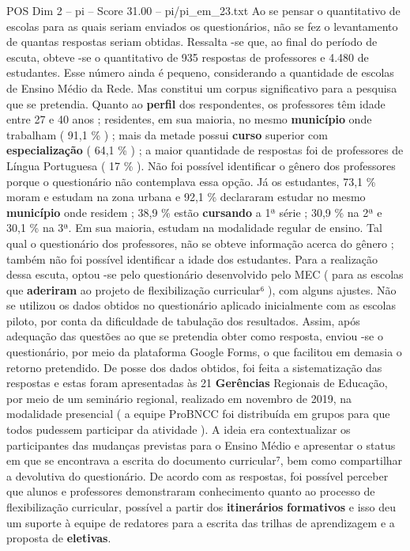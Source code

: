 \begin{textsample}{POS Dim 2 – pi – Score 31.00 – pi/pi\_em\_23.txt}
Ao se pensar o quantitativo de escolas para as quais seriam enviados os questionários, não se fez o levantamento de quantas respostas seriam obtidas.
Ressalta -se que, ao final do período de escuta, obteve -se o quantitativo de 935 respostas de professores e 4.480 de estudantes.
Esse número ainda é pequeno, considerando a quantidade de escolas de Ensino Médio da Rede.
Mas constitui um corpus significativo para a pesquisa que se pretendia.
Quanto ao \textbf{perfil} dos respondentes, os professores têm idade entre 27 e 40 anos ; residentes, em sua maioria, no mesmo \textbf{município} onde trabalham ( 91,1 \% ) ; mais da metade possui \textbf{curso} superior com \textbf{especialização} ( 64,1 \% ) ; a maior quantidade de respostas foi de professores de Língua Portuguesa ( 17 \% ).
Não foi possível identificar o gênero dos professores porque o questionário não contemplava essa opção.
Já os estudantes, 73,1 \% moram e estudam na zona urbana e 92,1 \% declararam estudar no mesmo \textbf{município} onde residem ; 38,9 \% estão \textbf{cursando} a 1ª série ; 30,9 \% na 2ª e 30,1 \% na 3ª.
Em sua maioria, estudam na modalidade regular de ensino.
Tal qual o questionário dos professores, não se obteve informação acerca do gênero ; também não foi possível identificar a idade dos estudantes.
Para a realização dessa escuta, optou -se pelo questionário desenvolvido pelo MEC ( para as escolas que \textbf{aderiram} ao projeto de flexibilização curricular⁶ ), com alguns ajustes.
Não se utilizou os dados obtidos no questionário aplicado inicialmente com as escolas piloto, por conta da dificuldade de tabulação dos resultados.
Assim, após adequação das questões ao que se pretendia obter como resposta, enviou -se o questionário, por meio da plataforma Google Forms, o que facilitou em demasia o retorno pretendido.
De posse dos dados obtidos, foi feita a sistematização das respostas e estas foram apresentadas às 21 \textbf{Gerências} Regionais de Educação, por meio de um seminário regional, realizado em novembro de 2019, na modalidade presencial ( a equipe ProBNCC foi distribuída em grupos para que todos pudessem participar da atividade ).
A ideia era contextualizar os participantes das mudanças previstas para o Ensino Médio e apresentar o status em que se encontrava a escrita do documento curricular⁷, bem como compartilhar a devolutiva do questionário.
De acordo com as respostas, foi possível perceber que alunos e professores demonstraram conhecimento quanto ao processo de flexibilização curricular, possível a partir dos \textbf{itinerários} \textbf{formativos} e isso deu um suporte à equipe de redatores para a escrita das trilhas de aprendizagem e a proposta de \textbf{eletivas}.

\end{textsample}
